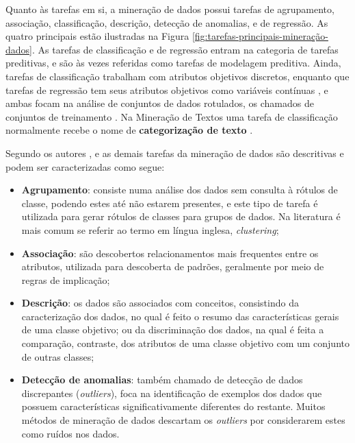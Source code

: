         Quanto às tarefas em si, a mineração de dados possui tarefas de agrupamento, associação, classificação, descrição, detecção de anomalias, e de regressão.
        As quatro principais estão ilustradas na Figura \ref{fig:tarefas-principais-mineração-dados}.
        As tarefas de classificação e de regressão entram na categoria de tarefas preditivas, e são às vezes referidas como tarefas de modelagem preditiva. 
        Ainda, tarefas de classificação trabalham com atributos objetivos discretos, enquanto que tarefas de regressão tem seus atributos objetivos como variáveis contínuas \cite[p.~7--8]{TanIDM2014}, e ambas focam na análise de conjuntos de dados rotulados, os chamados de conjuntos de treinamento \cite[p.~19]{Han:2011:DMC:1972541}.
        Na Mineração de Textos uma tarefa de classificação normalmente recebe o nome de \textbf{categorização de texto} \cite[p.~6]{TurchiATPUKM2009} \cite[p.~61]{Feldman:2006:TMH:1076381}.
        
        
        
        Segundo os autores ,  e  as demais tarefas da mineração de dados são descritivas e podem ser caracterizadas como segue:
        \begin{itemize}
            \item \textbf{Agrupamento}: consiste numa análise dos dados sem consulta à rótulos de classe, podendo estes até não estarem presentes, e este tipo de tarefa é utilizada para gerar rótulos de classes para grupos de dados. 
            Na literatura é mais comum se referir ao termo em língua inglesa, \textit{clustering};
            
            \item \textbf{Associação}: são descobertos relacionamentos mais frequentes entre os atributos, utilizada para descoberta de padrões, geralmente por meio de regras de implicação;
            
            \item \textbf{Descrição}: os dados são associados com conceitos, consistindo da caracterização dos dados, no qual é feito o resumo das características gerais de uma classe objetivo; 
            ou da discriminação dos dados, na qual é feita a comparação, contraste, dos atributos de uma classe objetivo com um conjunto de outras classes;
            
            \item \textbf{Detecção de anomalias}: também chamado de detecção de dados discrepantes (\textit{outliers}), foca na identificação de exemplos dos dados que possuem características significativamente diferentes do restante. 
            Muitos métodos de mineração de dados descartam os \textit{outliers} por considerarem estes como ruídos nos dados.
        \end{itemize}
    
